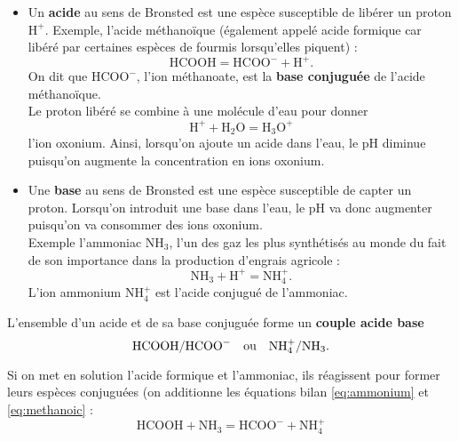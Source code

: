 \documentclass[11pt,a4paper]{report}
\begin{document}
\begin{itemize}
	\item Un \textbf{acide} au sens de Bronsted est une espèce susceptible de libérer un proton 
	$\text{H}^+$. Exemple, l'acide méthanoïque (également appelé acide formique car libéré par 				certaines espèces de fourmis lorsqu'elles piquent) :
	\begin{equation}
		\text{HCOOH} = \text{HCOO}^- + \text{H}^+.
		\label{eq:methanoic}
	\end{equation}
	On dit que $\text{HCOO}^-$, l'ion méthanoate, est la \textbf{base conjuguée} de l'acide 				méthanoïque.\\
	Le proton libéré se combine à une molécule d'eau pour donner
	\begin{equation}
		\text{H}^+ + \text{H}_2\text{O} = \text{H}_3\text{O}^+
	\end{equation}
	l'ion oxonium. Ainsi, lorsqu'on ajoute un acide dans l'eau, le pH diminue puisqu'on augmente la 		concentration en ions oxonium.\\
	
	\item Une \textbf{base} au sens de Bronsted est une espèce susceptible de capter un proton. 			Lorsqu'on introduit une base dans l'eau, le pH va donc augmenter puisqu'on va consommer des ions 	oxonium.\\
	Exemple l'ammoniac $\text{NH}_3$, l'un des gaz les plus synthétisés au monde du fait de son 			importance dans la production d'engrais agricole :
	\begin{equation}
		\text{NH}_3 + \text{H}^+ = \text{NH}_4^+.
		\label{eq:ammonium}
	\end{equation}
	L'ion ammonium $\text{NH}_4^+$ est l'acide conjugué de l'ammoniac.\\
\end{itemize}

L'ensemble d'un acide et de sa base conjuguée forme un \textbf{couple acide base}
\begin{equation}
	\text{HCOOH}/\text{HCOO}^-  \quad\text{ou}\quad \text{NH}_4^+/\text{NH}_3.\\
\end{equation}

Si on met en solution l'acide formique et l'ammoniac, ils réagissent pour former leurs espèces conjuguées (on additionne les équations bilan \eqref{eq:ammonium} et \eqref{eq:methanoic} :
\begin{equation}
	\text{HCOOH} + \text{NH}_3 = \text{HCOO}^- + \text{NH}_4^+
\end{equation}
\end{document}
